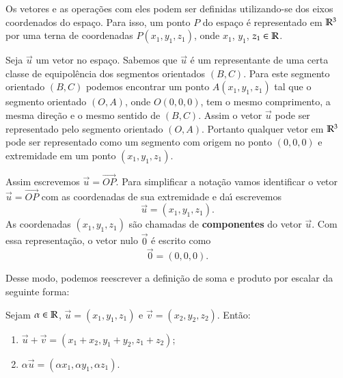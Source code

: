 Os vetores e as opera\c{c}\~oes com eles podem ser definidas utilizando-se dos eixos coordenados do espa\c{c}o. Para isso, um ponto $P$ do espa\c{c}o \'e representado em $\mathbb{R}^3$ por uma terna de coordenadas $P(x_1, y_1,z_1)$, onde $x_1$, $y_1$, $z_1 \in \mathbb{R}$.

Seja $\vec{u}$ um vetor no espa\c{c}o. Sabemos que $\vec{u}$ \'e um representante de uma certa classe de equipol\^encia dos segmentos orientados $(B,C)$. Para este segmento orientado $(B,C)$ podemos encontrar um ponto $A(x_1, y_1,z_1)$ tal que o segmento orientado $(O,A)$, onde $O(0,0,0)$, tem o mesmo comprimento, a mesma dire\c{c}\~ao e o mesmo sentido de $(B,C)$. Assim o vetor $\vec{u}$ pode ser representado pelo segmento orientado $(O,A)$. Portanto qualquer vetor em $\mathbb{R}^3$ pode ser representado como um segmento com origem no ponto $(0,0,0)$ e extremidade em um ponto $(x_1,y_1,z_1)$.


Assim escrevemos $\vec{u} = \vec{OP}$. Para simplificar a nota\c{c}\~ao vamos identificar o vetor $\vec{u} = \vec{OP}$ com as coordenadas de sua extremidade e da{\'\i} escrevemos
\[
  \vec{u} = (x_1,y_1,z_1).
\]
As coordenadas $(x_1,y_1,z_1)$ s\~ao chamadas de \textbf{componentes} do vetor $\vec{u}$. Com essa representa\c{c}\~ao, o vetor nulo $\vec{0}$ \'e escrito como
\[
  \vec{0} = (0,0,0).
\]

Desse modo, podemos reescrever a defini\c{c}\~ao de soma e produto por escalar da seguinte forma:
\begin{definicao}
  Sejam $\alpha \in \mathbb{R}$, $\vec{u} = (x_1, y_1,z_1)$ e $\vec{v} = (x_2, y_2,z_2)$. Ent\~ao:
  \begin{enumerate}
    \item $\vec{u} + \vec{v} = (x_1 + x_2, y_1 + y_2,z_1 + z_2)$;
    \item $\alpha \vec{u} = (\alpha x_1, \alpha y_1, \alpha z_1)$.
  \end{enumerate}
\end{definicao}


